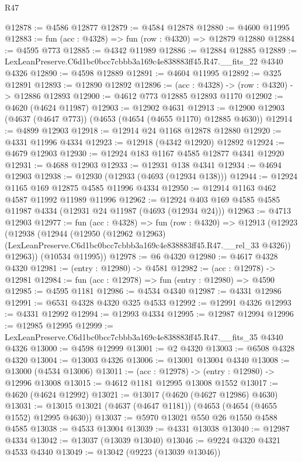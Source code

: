 \begin{lexlean}{R47}
\begin{coremodule}
@12878 := @4586 @12877
@12879 := @4584 @12878
@12880 := @4600 @11995
@12883 := fun (acc : @4328) => fun (row : @4320) => @12879 @12880
@12884 := @4595 @773
@12885 := @4342 @11989
@12886 := @12884 @12885
@12889 := LexLeanPreserve.C6d1bc0bcc7cbbb3a169c4e838883ff45.R47.__fits_22 @4340 @4326
@12890 := @4598 @12889
@12891 := @4604 @11995
@12892 := @325 @12891
@12893 := @12890 @12892
@12896 := (acc : @4328) -> (row : @4320) -> @12886 @12893
@12900 := @4612 @773 @12885 @12893 @1170
@12902 := @4620 (@4624 @11987)
@12903 := @12902 @4631
@12913 := @12900 @12903 (@4637 (@4647 @773)) (@4653 (@4654 (@4655 @1170) @12885 @4630))
@12914 := @4899 @12903
@12918 := @12914 @24 @1168 @12878 @12880
@12920 := @4331 @11996 @4334
@12923 := @12918 (@4342 @12920) @12892
@12924 := @4679 @12903
@12930 := @12924 @183 @1167 @4585 @12877 @4341 @12920
@12931 := @4688 @12903
@12933 := @12931 @138 @4341
@12934 := @4694 @12903
@12938 := @12930 (@12933 (@4693 (@12934 @138)))
@12944 := @12924 @1165 @169 @12875 @4585 @11996 @4334
@12950 := @12914 @1163 @462 @4587 @11992 @11989 @11996
@12962 := @12924 @403 @169 @4585 @4585 @11987 @4334 (@12931 @24 @11987 (@4693 (@12934 @24)))
@12963 := @4713 @12903
@12977 := fun (acc : @4328) =>
  fun (row : @4320) =>
  @12913
    (@12923
      (@12938
        (@12944
          (@12950
            (@12962 @12963)
            (LexLeanPreserve.C6d1bc0bcc7cbbb3a169c4e838883ff45.R47.__rel_33 @4326))
          @12963))
      (@10534 @11995))
@12978 := @6 @4320
@12980 := @4617 @4328 @4320
@12981 := (entry : @12980) -> @4581
@12982 := (acc : @12978) -> @12981
@12984 := fun (acc : @12978) => fun (entry : @12980) => @4590
@12985 := @4595 @1181
@12986 := @4534 @4340
@12987 := @4331 @12986
@12991 := @6531 @4328 @4320 @325 @4533
@12992 := @12991 @4326
@12993 := @4331 @12992
@12994 := @12993 @4334
@12995 := @12987 @12994
@12996 := @12985 @12995
@12999 := LexLeanPreserve.C6d1bc0bcc7cbbb3a169c4e838883ff45.R47.__fits_35 @4340 @4326
@13000 := @4598 @12999
@13001 := @2 @4320
@13003 := @6508 @4328 @4320
@13004 := @13003 @4326
@13006 := @13001 @13004 @4340
@13008 := @13000 (@4534 @13006)
@13011 := (acc : @12978) -> (entry : @12980) -> @12996 @13008
@13015 := @4612 @1181 @12995 @13008 @1552
@13017 := @4620 (@4624 @12992)
@13021 := @13017 (@4620 (@4627 @12986) @4630)
@13031 := @13015 @13021 (@4637 (@4647 @1181)) (@4653 (@4654 (@4655 @1552) @12995 @4630))
@13037 := @5970 @13021 @550 @26 @1550 @4588 @4585
@13038 := @4533 @13004
@13039 := @4331 @13038
@13040 := @12987 @4334
@13042 := @13037 (@13039 @13040)
@13046 := @9224 @4320 @4321 @4533 @4340
@13049 := @13042 (@9223 (@13039 @13046))

\end{coremodule}
\end{lexlean}
